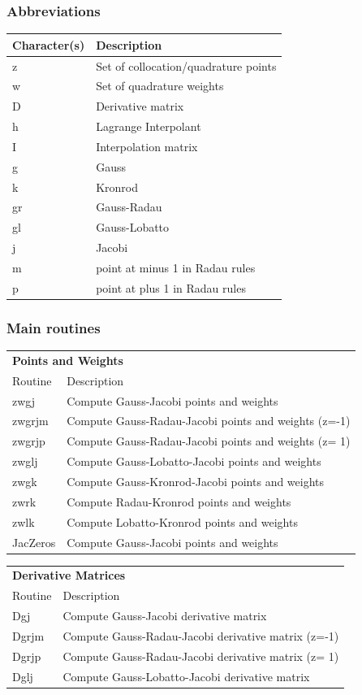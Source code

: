 \subsubsection{Abbreviations}
\begin{tabular}{ll}
\toprule
Character(s) & Description \\
\midrule
z & Set of collocation/quadrature points \\
w & Set of quadrature weights \\
D & Derivative matrix \\
h & Lagrange Interpolant \\
I & Interpolation matrix \\
g & Gauss \\
k & Kronrod \\
gr & Gauss-Radau \\
gl & Gauss-Lobatto \\
j & Jacobi \\
m & point at minus 1 in Radau rules \\
p & point at plus 1 in Radau rules \\
\bottomrule
\end{tabular}


\subsubsection{Main routines}
\begin{tabular}{ll}
\toprule
\multicolumn{2}{l}{\textbf{Points and Weights}} \\
Routine & Description \\
\midrule
zwgj & Compute Gauss-Jacobi points and weights \\
zwgrjm & Compute Gauss-Radau-Jacobi points and weights (z=-1) \\
zwgrjp & Compute Gauss-Radau-Jacobi points and weights (z= 1) \\
zwglj & Compute Gauss-Lobatto-Jacobi points and weights \\
zwgk & Compute Gauss-Kronrod-Jacobi points and weights \\
zwrk & Compute Radau-Kronrod points and weights \\
zwlk & Compute Lobatto-Kronrod points and weights \\
JacZeros & Compute Gauss-Jacobi points and weights \\
\bottomrule
\end{tabular}

\begin{tabular}{ll}
\toprule
\multicolumn{2}{l}{\textbf{Derivative Matrices}} \\
Routine & Description \\
\midrule
Dgj & Compute Gauss-Jacobi derivative matrix \\
Dgrjm & Compute Gauss-Radau-Jacobi derivative matrix (z=-1) \\
Dgrjp & Compute Gauss-Radau-Jacobi derivative matrix (z= 1) \\
Dglj & Compute Gauss-Lobatto-Jacobi derivative matrix \\
\bottomrule
\end{tabular}

